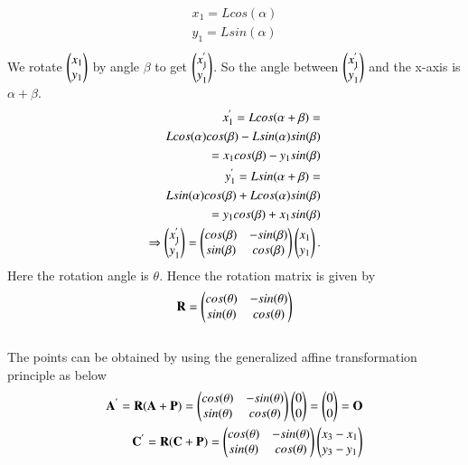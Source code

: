 \documentclass[journal,12pt,twocolumn]{IEEEtran}
\begin{document}
\begin{align}
\begin{split}
x_1= Lcos(\alpha)\\
y_1= Lsin(\alpha)\\
\end{split}
\end{align}
We rotate $\begin{pmatrix}x_1\\y_1\end{pmatrix}$ by angle $\beta$ to get $\begin{pmatrix}x_1^{'}\\y_1^{'}\end{pmatrix}$. So the angle between $\begin{pmatrix}x_1^{'}\\y_1^{'}\end{pmatrix}$ and the x-axis is $\alpha+\beta$.
\begin{align}
\begin{split}
x_1^{'}= Lcos(\alpha+\beta)=\\
Lcos(\alpha)cos(\beta)-Lsin(\alpha)sin(\beta)\\
=x_1cos(\beta)-y_1sin(\beta)\\
y_1^{'}= Lsin(\alpha+\beta)=\\
Lsin(\alpha)cos(\beta)+Lcos(\alpha)sin(\beta)\\
=y_1cos(\beta)+x_1sin(\beta)\\
\Rightarrow \begin{pmatrix}x_1^{'}\\y_1^{'}\end{pmatrix}=\begin{pmatrix}cos(\beta)&-sin(\beta)\\sin(\beta)&cos(\beta)\end{pmatrix}\begin{pmatrix}x_1\\y_1\end{pmatrix}.\\
\end{split}
\end{align}
Here the rotation angle is $\theta$. Hence the rotation matrix is given by
\begin{align}
\begin{split}
\mathbf{R}=\begin{pmatrix}cos(\theta) & -sin(\theta)\\sin(\theta) & cos(\theta)\end{pmatrix}\\ 
\end{split}
\end{align}
\\
The points can be obtained by using the generalized affine transformation principle as below
\begin{align}
\begin{split}
\mathbf{A^{'}} = \mathbf{R}(\mathbf{A+P})=\begin{pmatrix}cos(\theta) & -sin(\theta)\\sin(\theta) & cos(\theta)\end{pmatrix}\begin{pmatrix}0\\0\end{pmatrix} = \begin{pmatrix}0\\0\end{pmatrix} = \mathbf{O}\\
\mathbf{C^{'}} = \mathbf{R}(\mathbf{C+P})=\begin{pmatrix}cos(\theta) & -sin(\theta)\\sin(\theta) & cos(\theta)\end{pmatrix}\begin{pmatrix}x_3-x_1\\y_3-y_1\end{pmatrix}\\
\end{split}
\end{align}
\end{document}
